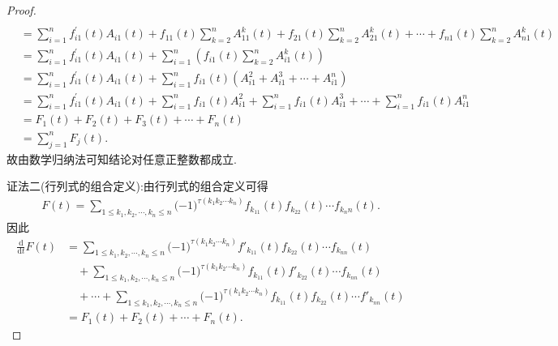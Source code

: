 \documentclass[../../main.tex]{subfiles}%
\begin{document}
\begin{proof}
\begin{align*}
\\
&=\sum_{i=1}^n{f_{i1}^{\prime}\left( t \right) A_{i1}\left( t \right)}+f_{11}\left( t \right) \sum_{k=2}^{n}{A_{11}^{k}(t)}+f_{21}\left( t \right) \sum_{k=2}^{n}{A_{21}^{k}(t)}+\cdots +f_{n1}\left( t \right) \sum_{k=2}^{n}{A_{n1}^{k}(t)}
\\
&=\sum_{i=1}^n{f_{i1}^{\prime}\left( t \right) A_{i1}\left( t \right)}+\sum_{i=1}^n{\left( f_{i1}\left( t \right) \sum_{k=2}^n{A_{i1}^{k}\left( t \right)} \right)}
\\
&=\sum_{i=1}^n{f_{i1}^{\prime}\left( t \right) A_{i1}\left( t \right)}+\sum_{i=1}^n{f_{i1}\left( t \right) \left( A_{i1}^{2}+A_{i1}^{3}+\cdots +A_{i1}^{n} \right)}
\\
&=\sum_{i=1}^n{f_{i1}^{\prime}\left( t \right) A_{i1}\left( t \right)}+\sum_{i=1}^n{f_{i1}\left( t \right) A_{i1}^{2}}+\sum_{i=1}^n{f_{i1}\left( t \right) A_{i1}^{3}}+\cdots +\sum_{i=1}^n{f_{i1}\left( t \right) A_{i1}^{n}}
\\
&=F_1\left( t \right) +F_2\left( t \right) +F_3\left( t \right) +\cdots +F_n\left( t \right) 
\\
&=\sum_{j=1}^n{F_j\left( t \right)}.
\end{align*}
故由数学归纳法可知结论对任意正整数都成立.

{\color{blue}证法二(行列式的组合定义):}由行列式的组合定义可得
\begin{align*}
F(t)=\sum_{1\leqslant k_1,k_2,\cdots ,k_n\leqslant n}{(}-1)^{\tau (k_1k_2\cdots k_n)}f_{k_11}(t)f_{k_22}(t)\cdots f_{k_nn}(t).
\end{align*}
因此
\begin{align*}
\frac{\mathrm{d}}{\mathrm{d}t}F(t)&=\sum_{1\leqslant k_1,k_2,\cdots ,k_n\leqslant n}{(}-1)^{\tau (k_1k_2\cdots k_n)}f'_{k_{11}}(t)f_{k_{22}}(t)\cdots f_{k_{nn}}(t)
\\
&\quad+\sum_{1\leqslant k_1,k_2,\cdots ,k_n\leqslant n}{(}-1)^{\tau (k_1k_2\cdots k_n)}f_{k_{11}}(t)f'_{k_{22}}(t)\cdots f_{k_{nn}}(t)
\\
&\quad+\cdots +\sum_{1\leqslant k_1,k_2,\cdots ,k_n\leqslant n}{(}-1)^{\tau (k_1k_2\cdots k_n)}f_{k_{11}}(t)f_{k_{22}}(t)\cdots f'_{k_{nn}}(t)
\\
&=F_1(t)+F_2(t)+\cdots +F_n(t).
\end{align*}


\end{proof}
\end{document}
